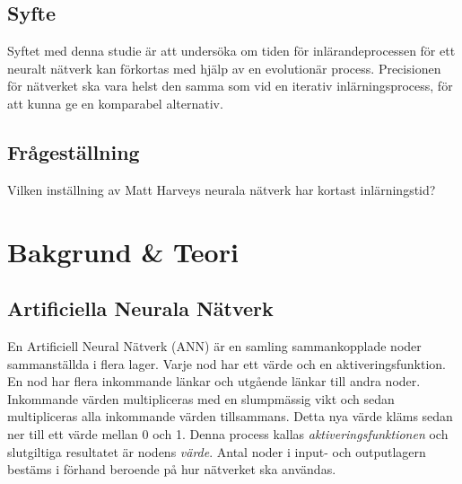 \documentclass[a4paper, 11pt]{article}
\begin{document}
    \subsection{Syfte}
    Syftet med denna studie är att undersöka om tiden för inlärandeprocessen för ett neuralt nätverk kan förkortas med hjälp av en evolutionär process. Precisionen för nätverket ska vara helst den samma som vid en iterativ inlärningsprocess, för att kunna ge en komparabel alternativ.
    \subsection{Frågeställning}
    Vilken inställning av Matt Harveys neurala nätverk har kortast inlärningstid?

  \section{Bakgrund \& Teori}
    \subsection{Artificiella Neurala Nätverk}
    En Artificiell Neural Nätverk (ANN) är en samling sammankopplade noder sammanställda i flera lager. Varje nod har ett värde och en aktiveringsfunktion. En nod har flera inkommande länkar och utgående länkar till andra noder. Inkommande värden multipliceras med en slumpmässig vikt och sedan multipliceras alla inkommande värden tillsammans. Detta nya värde kläms sedan ner till ett värde mellan 0 och 1. Denna process kallas \textit{aktiveringsfunktionen} och slutgiltiga resultatet är nodens \textit{värde}. Antal noder i input- och outputlagern bestäms i förhand beroende på hur nätverket ska användas.
\end{document}
